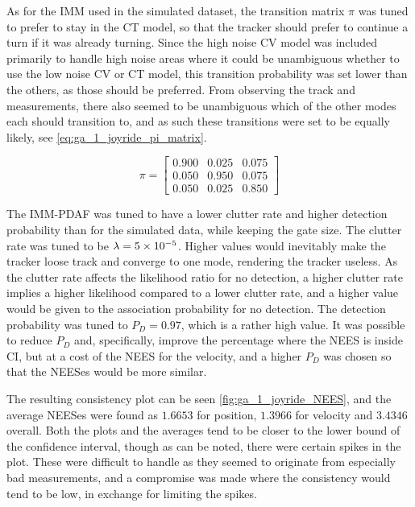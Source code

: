 As for the IMM used in the simulated dataset, the transition matrix $\pi$ was tuned to prefer to stay in the CT model, so that the tracker should prefer to continue a turn if it was already turning. Since the high noise CV model was included primarily to handle high noise areas where it could be unambiguous whether to use the low noise CV or CT model, this transition probability was set lower than the others, as those should be preferred. From observing the track and measurements, there also seemed to be unambiguous which of the other modes each should transition to, and as such these transitions were set to be equally likely, see \cref{eq:ga_1_joyride_pi_matrix}. 

\begin{equation}
    \label{eq:ga_1_joyride_pi_matrix}
    \pi = \begin{bmatrix}
        0.900 & 0.025 & 0.075 \\
        0.050 & 0.950 & 0.075 \\
        0.050 & 0.025 & 0.850 
    \end{bmatrix}
\end{equation}

The IMM-PDAF was tuned to have a lower clutter rate and higher detection probability than for the simulated data, while keeping the gate size. The clutter rate was tuned to be $\lambda = {5} \times 10^{-5}$. Higher values would inevitably make the tracker loose track and converge to one mode, rendering the tracker useless. As the clutter rate affects the likelihood ratio for no detection, a higher clutter rate implies a higher likelihood compared to a lower clutter rate, and a higher value would be given to the association probability for no detection. The detection probability was tuned to $P_D = 0.97$, which is a rather high value. It was possible to reduce $P_D$ and, specifically, improve the percentage where the NEES is inside CI, but at a cost of the NEES for the velocity, and a higher $P_D$ was chosen so that the NEESes would be more similar. 

The resulting consistency plot can be seen \cref{fig:ga_1_joyride_NEES}, and the average NEESes were found as $1.6653$ for position, $1.3966$ for velocity and $3.4346$ overall. Both the plots and the averages tend to be closer to the lower bound of the confidence interval, though as can be noted, there were certain spikes in the plot. These were difficult to handle as they seemed to originate from especially bad measurements, and a compromise was made where the consistency would tend to be low, in exchange for limiting the spikes.


